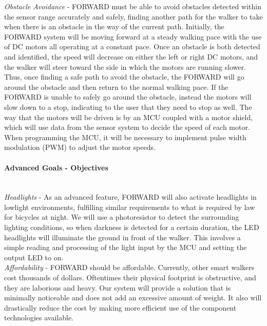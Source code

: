 \noindent \textit{Obstacle Avoidance} - FORWARD must be able to avoid obstacles detected within the sensor range accurately and safely, finding another path for the walker to take when there is an obstacle in the way of the current path. Initially, the FORWARD system will be moving forward at a steady walking pace with the use of DC motors all operating at a constant pace. Once an obstacle is both detected and identified, the speed will decrease on either the left or right DC motors, and the walker will steer toward the side in which the motors are running slower. Thus, once finding a safe path to avoid the obstacle, the FORWARD will go around the obstacle and then return to the normal walking pace. If the FORWARD is unable to safely go around the obstacle, instead the motors will slow down to a stop, indicating to the user that they need to stop as well. The way that the motors will be driven is by an MCU coupled with a motor shield, which will use data from the sensor system to decide the speed of each motor. When programming the MCU, it will be necessary to implement pulse width modulation (PWM) to adjust the motor speeds. 
\\


\paragraph{Advanced Goals - Objectives}

\noindent \\ \textit{Headlights} - As an advanced feature, FORWARD will also activate headlights in lowlight environments, fulfilling similar requirements to what is required by law for bicycles at night. We will use a photoresistor to detect the surrounding lighting conditions, so when darkness is detected for a certain duration, the LED headlights will illuminate the ground in front of the walker. This involves a simple reading and processing of the light input by the MCU and setting the output LED to on. 
\\


\noindent \textit{Affordability} - FORWARD should be affordable. Currently, other smart walkers cost thousands of dollars. Oftentimes their physical footprint is obstructive, and they are laborious and heavy. Our system will provide a solution that is minimally noticeable and does not add an excessive amount of weight. It also will drastically reduce the cost by making more efficient use of the component technologies available. 
\\


